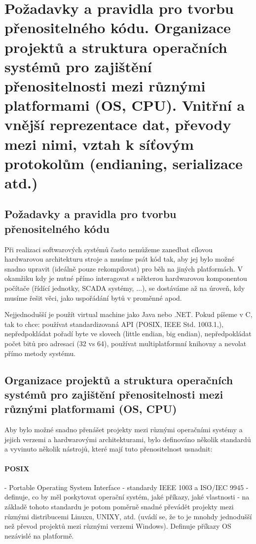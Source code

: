 \section[OSP - Přenositelnost, multiplatformnost]{Požadavky a pravidla pro tvorbu přenositelného kódu. Organizace projektů a struktura operačních systémů pro zajištění přenositelnosti mezi různými platformami (OS, CPU). Vnitřní a vnější reprezentace dat, převody mezi nimi, vztah k síťovým protokolům (endianing, serializace atd.)}

\subsection{Požadavky a pravidla pro tvorbu přenositelného kódu}
Při realizaci softwarových systémů často nemůžeme zanedbat cílovou hardwarovou architekturu stroje a musíme psát kód tak, aby jej bylo možné snadno upravit (ideálně pouze rekompilovat) pro běh na jiných platformách. V okamžiku kdy je nutné přímo interagovat s některou hardwarovou komponentou počítače (řídící jednotky, SCADA systémy, $\hdots$), se dostáváme až na úroveň, kdy musíme řešit věci, jako uspořádání bytů v proměnné apod.

Nejjednodušší je použít virtual machine jako Java nebo .NET. Pokud píšeme v C, tak to chce: používat standardizovaná API (POSIX, IEEE Std. 1003.1,), nepředpokládat pořadí byte ve slovech (little endian, big endian), nepředpokládat počet bitů pro adresaci (32 vs 64), používat multiplatformní knihovny a nevolat přímo metody systému.

\subsection{Organizace projektů a struktura operačních systémů pro zajištění přenositelnosti mezi různými platformami (OS, CPU)}

Aby bylo možné snadno přenášet projekty mezi různými operačními systémy a jejich verzemi a hardwarovými architekturami, bylo definováno několik standardů a vyvinuto několik nástrojů, které mají tuto přenositelnost usnadnit:
\paragraph{POSIX} - Portable Operating System Interface - standardy IEEE 1003 a ISO/IEC 9945 - definuje, co by měl poskytovat operační systém, jaké příkazy, jaké vlastnosti - na základě tohoto standardu je potom poměrně snadné převádět projekty mezi různými distribucemi Linuxu, UNIXY, atd. (uvádí se, že to je mnohdy jednodušší než převod projektů mezi různými verzemi Windows). Definuje příkazy OS nezávislé na platformě.

